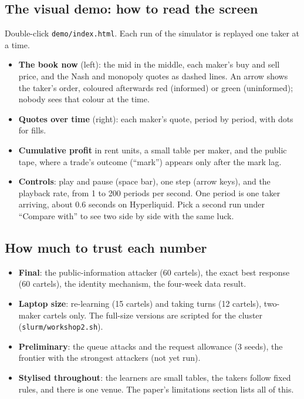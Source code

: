\documentclass[11pt]{article}
\begin{document}
\subsection{The visual demo: how to read the screen}
Double-click \texttt{demo/index.html}. Each run of the simulator is replayed one taker at a time.
\begin{itemize}
\item \textbf{The book now} (left): the mid in the middle, each maker's buy and sell price, and the
Nash and monopoly quotes as dashed lines. An arrow shows the taker's order, coloured afterwards red
(informed) or green (uninformed); nobody sees that colour at the time.
\item \textbf{Quotes over time} (right): each maker's quote, period by period, with dots for fills.
\item \textbf{Cumulative profit} in rent units, a small table per maker, and the public tape, where a
trade's outcome (``mark'') appears only after the mark lag.
\item \textbf{Controls}: play and pause (space bar), one step (arrow keys), and the playback rate,
from 1 to 200 periods per second. One period is one taker arriving, about 0.6 seconds on Hyperliquid.
Pick a second run under ``Compare with'' to see two side by side with the same luck.
\end{itemize}

\subsection{How much to trust each number}
\begin{itemize}
\item \textbf{Final}: the public-information attacker (60 cartels), the exact best response (60 cartels),
the identity mechanism, the four-week data result.
\item \textbf{Laptop size}: re-learning (15 cartels) and taking turns (12 cartels), two-maker cartels
only. The full-size versions are scripted for the cluster (\texttt{slurm/workshop2.sh}).
\item \textbf{Preliminary}: the queue attacks and the request allowance (3 seeds), the frontier with the
strongest attackers (not yet run).
\item \textbf{Stylised throughout}: the learners are small tables, the takers follow fixed rules, and
there is one venue. The paper's limitations section lists all of this.
\end{itemize}
\end{document}
